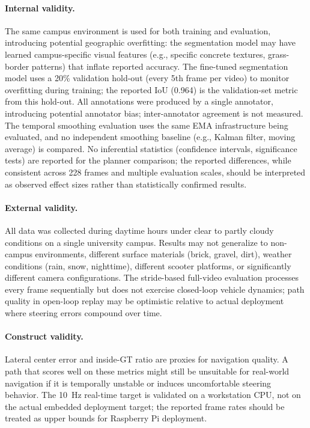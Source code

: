 \documentclass[12pt,letterpaper,oneside]{report}
\begin{document}
\paragraph{Internal validity.} The same campus environment is used for both training and evaluation, introducing potential geographic overfitting: the segmentation model may have learned campus-specific visual features (e.g., specific concrete textures, grass-border patterns) that inflate reported accuracy.  The fine-tuned segmentation model uses a 20\% validation hold-out (every 5th frame per video) to monitor overfitting during training; the reported IoU (0.964) is the validation-set metric from this hold-out.  All annotations were produced by a single annotator, introducing potential annotator bias; inter-annotator agreement is not measured.  The temporal smoothing evaluation uses the same EMA infrastructure being evaluated, and no independent smoothing baseline (e.g., Kalman filter, moving average) is compared.  No inferential statistics (confidence intervals, significance tests) are reported for the planner comparison; the reported differences, while consistent across 228 frames and multiple evaluation scales, should be interpreted as observed effect sizes rather than statistically confirmed results.

\paragraph{External validity.} All data was collected during daytime hours under clear to partly cloudy conditions on a single university campus.  Results may not generalize to non-campus environments, different surface materials (brick, gravel, dirt), weather conditions (rain, snow, nighttime), different scooter platforms, or significantly different camera configurations.  The stride-based full-video evaluation processes every frame sequentially but does not exercise closed-loop vehicle dynamics; path quality in open-loop replay may be optimistic relative to actual deployment where steering errors compound over time.

\paragraph{Construct validity.} Lateral center error and inside-GT ratio are proxies for navigation quality.  A path that scores well on these metrics might still be unsuitable for real-world navigation if it is temporally unstable or induces uncomfortable steering behavior.  The 10~Hz real-time target is validated on a workstation CPU, not on the actual embedded deployment target; the reported frame rates should be treated as upper bounds for Raspberry Pi deployment.
\end{document}
